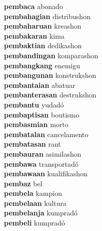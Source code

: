 \textbf{pembaca } abonado \\
\textbf{pembahagian } distribushon \\
\textbf{pembaharuan } kreashon \\
\textbf{pembakaran } kima \\
\textbf{pembaktian } dedikashon \\
\textbf{pembandingan } komparashon \\
\textbf{pembangkang } enemigu \\
\textbf{pembangunan } konstrukshon \\
\textbf{pembantaian } abatuar \\
\textbf{pembanterasan } destrukshon \\
\textbf{pembantu } yudadó \\
\textbf{pembaptisan } boutismo \\
\textbf{pembasmian } morto \\
\textbf{pembatalan } cancelamento \\
\textbf{pembatasan } rant \\
\textbf{pembauran } asimilashon \\
\textbf{pembawa } transportadó \\
\textbf{pembawaan } kualifikashon \\
\textbf{pembaz } bel \\
\textbf{pembela } kampion \\
\textbf{pembelaan } kultura \\
\textbf{pembelanja } kumpradó \\
\textbf{pembeli } kumpradó \\
